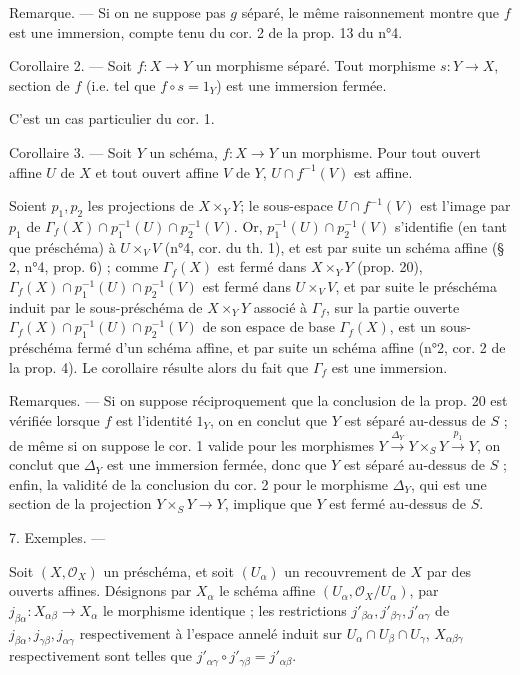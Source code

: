 Remarque. — Si on ne suppose pas $g$ séparé, le même raisonnement montre que $f$ est une immersion, compte tenu du cor. 2 de la prop. 13 du n°4.

Corollaire 2. — Soit $f: X \to Y$ un morphisme séparé. Tout morphisme $s: Y \to X$, section de $f$ (i.e. tel que $f \circ s = 1_Y$) est une immersion fermée.

C'est un cas particulier du cor. 1.

Corollaire 3. — Soit $Y$ un schéma, $f: X \to Y$ un morphisme. Pour tout ouvert affine $U$ de $X$ et tout ouvert affine $V$ de $Y$, $U \cap f^{-1}(V)$ est affine.

Soient $p_1, p_2$ les projections de $X \times_Y Y$; le sous-espace $U \cap f^{-1}(V)$ est l'image par $p_1$ de $\Gamma_f(X) \cap p_1^{-1}(U) \cap p_2^{-1}(V)$. Or, $p_1^{-1}(U) \cap p_2^{-1}(V)$ s'identifie (en tant que préschéma) à $U \times_V V$ (n°4, cor. du th. 1), et est par suite un schéma affine (§ 2, n°4, prop. 6) ; comme $\Gamma_f(X)$ est fermé dans $X \times_Y Y$ (prop. 20), $\Gamma_f(X) \cap p_1^{-1}(U) \cap p_2^{-1}(V)$ est fermé dans $U \times_V V$, et par suite le préschéma induit par le sous-préschéma de $X \times_Y Y$ associé à $\Gamma_f$, sur la partie ouverte $\Gamma_f(X) \cap p_1^{-1}(U) \cap p_2^{-1}(V)$ de son espace de base $\Gamma_f(X)$, est un sous-préschéma fermé d'un schéma affine, et par suite un schéma affine (n°2, cor. 2 de la prop. 4). Le corollaire résulte alors du fait que $\Gamma_f$ est une immersion.

Remarques. — Si on suppose réciproquement que la conclusion de la prop. 20 est vérifiée lorsque $f$ est l'identité $1_Y$, on en conclut que $Y$ est séparé au-dessus de $S$ ; de même si on suppose le cor. 1 valide pour les morphismes $Y \xrightarrow{\Delta_Y} Y \times_S Y \xrightarrow{p_1} Y$, on conclut que $\Delta_Y$ est une immersion fermée, donc que $Y$ est séparé au-dessus de $S$ ; enfin, la validité de la conclusion du cor. 2 pour le morphisme $\Delta_Y$, qui est une section de la projection $Y \times_S Y \to Y$, implique que $Y$ est fermé au-dessus de $S$.

\newpage


7. Exemples. —

Soit $(X, \mathcal{O}_X)$ un préschéma, et soit $(U_\alpha)$ un recouvrement de $X$ par des ouverts affines. Désignons par $X_\alpha$ le schéma affine $(U_\alpha, \mathcal{O}_X / U_\alpha)$, par $j_{\beta\alpha} : X_{\alpha\beta} \to X_\alpha$ le morphisme identique ; les restrictions $j'_{\beta\alpha}, j'_{\beta\gamma}, j'_{\alpha\gamma}$ de $j_{\beta\alpha}, j_{\gamma\beta}, j_{\alpha\gamma}$ respectivement à l'espace annelé induit sur $U_\alpha \cap U_\beta \cap U_\gamma$, $X_{\alpha\beta\gamma}$ respectivement sont telles que $j'_{\alpha\gamma} \circ j'_{\gamma\beta} = j'_{\alpha\beta}$.

